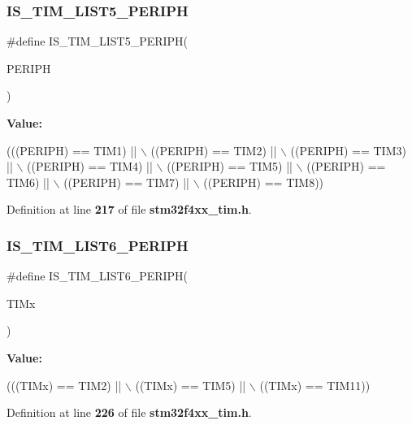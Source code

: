 \subsubsection{I\+S\+\_\+\+T\+I\+M\+\_\+\+L\+I\+S\+T5\+\_\+\+P\+E\+R\+I\+PH}
{\footnotesize\ttfamily \#define I\+S\+\_\+\+T\+I\+M\+\_\+\+L\+I\+S\+T5\+\_\+\+P\+E\+R\+I\+PH(\begin{DoxyParamCaption}\item[{}]{P\+E\+R\+I\+PH }\end{DoxyParamCaption})}

{\bfseries Value\+:}
\begin{DoxyCode}
(((PERIPH) == TIM1) || \(\backslash\)
                                     ((PERIPH) == TIM2) || \(\backslash\)
                                     ((PERIPH) == TIM3) || \(\backslash\)
                                     ((PERIPH) == TIM4) || \(\backslash\)
                                     ((PERIPH) == TIM5) || \(\backslash\)
                                     ((PERIPH) == TIM6) || \(\backslash\)
                                     ((PERIPH) == TIM7) || \(\backslash\)
                                     ((PERIPH) == TIM8))
\end{DoxyCode}


Definition at line \textbf{ 217} of file \textbf{ stm32f4xx\+\_\+tim.\+h}.

\mbox{\label{group__TIM__Exported__constants_ga9449f429a84af2291f431b990361e639}} 
\subsubsection{I\+S\+\_\+\+T\+I\+M\+\_\+\+L\+I\+S\+T6\+\_\+\+P\+E\+R\+I\+PH}
{\footnotesize\ttfamily \#define I\+S\+\_\+\+T\+I\+M\+\_\+\+L\+I\+S\+T6\+\_\+\+P\+E\+R\+I\+PH(\begin{DoxyParamCaption}\item[{}]{T\+I\+Mx }\end{DoxyParamCaption})}

{\bfseries Value\+:}
\begin{DoxyCode}
(((TIMx) == TIM2) || \(\backslash\)
                                 ((TIMx) == TIM5) || \(\backslash\)
                                 ((TIMx) == TIM11))
\end{DoxyCode}


Definition at line \textbf{ 226} of file \textbf{ stm32f4xx\+\_\+tim.\+h}.

